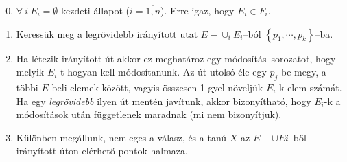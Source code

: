 \begin{enumerate}
    \setcounter{enumi}{-1}
    \item $\forall~i~E_i = \emptyset$ kezdeti állapot ($i=\overline{1,n}$). Erre
    igaz, hogy $E_i \in F_i$.
    \item Keressük meg a legrövidebb irányított utat $E-\cup_{i}E_i$--ból
    $\left\{ p_1, \cdots, p_k \right\}$--ba.
    
    \item Ha létezik irányított út akkor ez meghatároz egy módosítás--sorozatot,
    hogy melyik $E_i$-t hogyan kell módosítanunk. Az út utolsó éle egy $p_j$-be
    megy, a többi $E$-beli elemek között, vagyis összesen 1-gyel növeljük
    $E_i$-k elem számát.  Ha egy {\it legrövidebb} ilyen út mentén javítunk,
    akkor bizonyítható, hogy $E_i$-k a módosítások után függetlenek maradnak (mi
    nem bizonyítjuk).
    \item Különben megállunk, nemleges a válasz, és a tanú $X$ az $E- \cup Ei$--ből
    irányított úton elérhető pontok halmaza.
\end{enumerate} 

